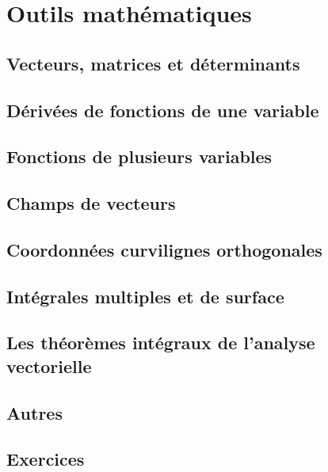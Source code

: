 \part{Outils mathématiques} 

\chapter{Vecteurs, matrices et déterminants}
    

\chapter{Dérivées de fonctions de une variable}


\chapter{Fonctions de plusieurs variables}


\chapter{Champs de vecteurs}


\chapter{Coordonnées curvilignes orthogonales}


\chapter{Intégrales multiples et de surface}


\chapter{Les théorèmes intégraux de l'analyse vectorielle}


\chapter{Autres}


\chapter{Exercices}


